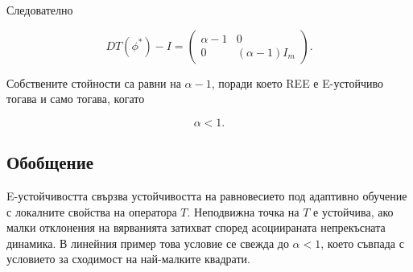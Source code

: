 Следователно

\[
DT(\phi^\ast)-I=
\begin{pmatrix}
\alpha-1 & 0 \\
0 & (\alpha-1) I_m
\end{pmatrix}.
\]

Собствените стойности са равни на $\alpha-1$, поради което REE е E-устойчиво тогава и само тогава, когато

\[
\alpha < 1.
\]

\subsection*{Обобщение}

E-устойчивостта свързва устойчивостта на равновесието под адаптивно обучение с локалните свойства на оператора $T$. Неподвижна точка на $T$ е устойчива, ако малки отклонения на вярванията затихват според асоциираната непрекъсната динамика. В линейния пример това условие се свежда до $\alpha<1$, което съвпада с условието за сходимост на най-малките квадрати.
